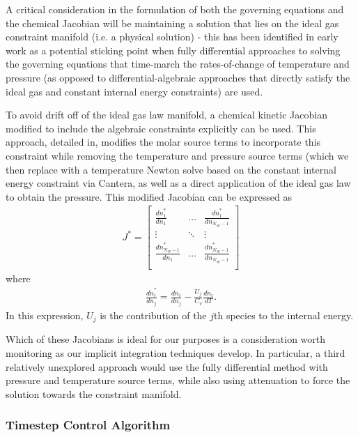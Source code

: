 A critical consideration in the formulation of both the governing equations
and the chemical Jacobian will be maintaining a solution
that lies on the ideal gas constraint manifold (i.e. a physical solution) - this
has been identified in early work as a potential sticking point when fully
differential approaches to solving the governing equations that time-march
the rates-of-change of temperature and pressure (as opposed to
differential-algebraic approaches that directly satisfy the ideal gas and
constant internal energy constraints) are used.

To avoid drift off of the ideal gas law manifold, a chemical
kinetic Jacobian modified to include the algebraic constraints explicitly can
be used. This approach, detailed in, modifies the molar source terms to incorporate
this constraint while removing the temperature and pressure source terms (which
we then replace with a temperature Newton solve based on the constant internal
energy constraint via Cantera, as well as a direct application of the ideal
gas law to obtain the pressure. This modified Jacobian can be expressed as
\begin{align}
J^{*} = \begin{bmatrix}	\frac{d\dot{n}_{1}^{*}}{dn_{1}} & \hdots & \frac{d\dot{n}_{1}^{*}}{dn_{N_{sp}-1}} \\
	                \vdots & \ddots & \vdots \\
	                \frac{d\dot{n}_{N_{sp}-1}^{*}}{dn_{1}} & \hdots & \frac{d\dot{n}_{N_{sp}-1}^{*}}{dn_{N_{sp}-1}} \\
    \end{bmatrix}
\end{align}
where
\begin{align}
\frac{d\dot{n}_{i}^{*}}{dn_{j}} = \frac{d\dot{n}_{i}}{dn_{j}} - \frac{U_{j}}{C_{v}}\frac{d\dot{n}_{i}}{dT}.
\end{align}
In this expression, $U_{j}$ is the contribution of the $j$th species to the
internal energy.

Which of these Jacobians is ideal for our purposes is a consideration worth
monitoring as our implicit integration techniques develop. In particular, 
a third relatively unexplored approach would use the fully differential
method with pressure and temperature source terms, while also using attenuation
to force the solution towards the constraint manifold.

\subsubsection{Timestep Control Algorithm}

